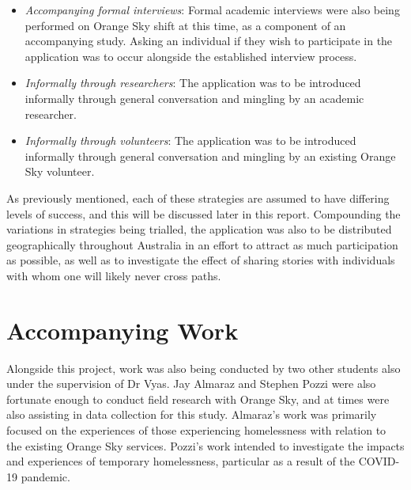 \begin{itemize}
    \item \emph{Accompanying formal interviews}: Formal academic interviews were also being performed on Orange Sky shift at this time, as a component of an accompanying study. Asking an individual if they wish to participate in the application was to occur alongside the established interview process.
    \item \emph{Informally through researchers}: The application was to be introduced informally through general conversation and mingling by an academic researcher.
    \item \emph{Informally through volunteers}: The application was to be introduced informally through general conversation and mingling by an existing Orange Sky volunteer.
\end{itemize}

As previously mentioned, each of these strategies are assumed to have differing levels of success, and this will be discussed later in this report. Compounding the variations in strategies being trialled, the application was also to be distributed geographically throughout Australia in an effort to attract as much participation as possible, as well as to investigate the effect of sharing stories with individuals with whom one will likely never cross paths.

\section{Accompanying Work}

Alongside this project, work was also being conducted by two other students also under the supervision of Dr Vyas. Jay Almaraz and Stephen Pozzi were also fortunate enough to conduct field research with Orange Sky, and at times were also assisting in data collection for this study. Almaraz's work was primarily focused on the experiences of those experiencing homelessness with relation to the existing Orange Sky services. Pozzi's work intended to investigate the impacts and experiences of temporary homelessness, particular as a result of the COVID-19 pandemic.